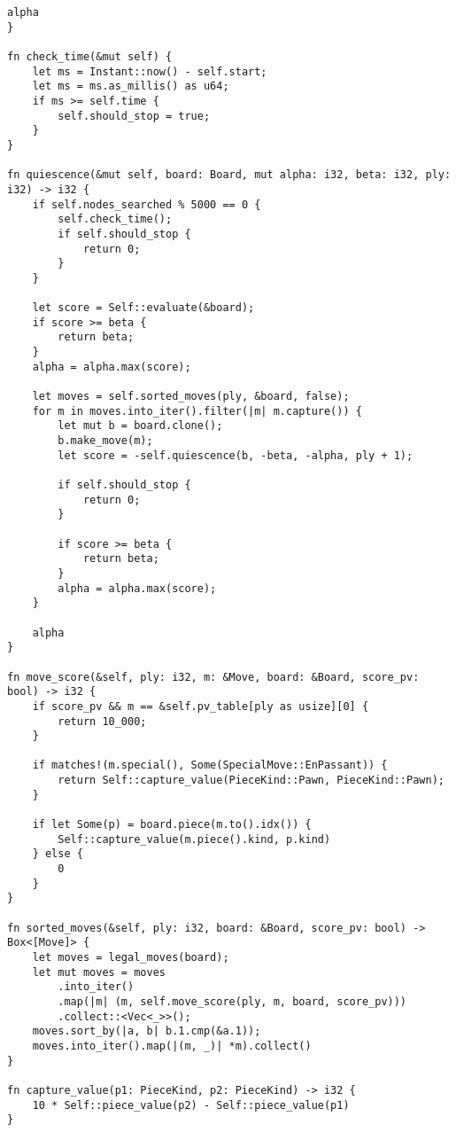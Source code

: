 \begin{lstlisting}[language=RustHtml]
    alpha
}

fn check_time(&mut self) {
    let ms = Instant::now() - self.start;
    let ms = ms.as_millis() as u64;
    if ms >= self.time {
        self.should_stop = true;
    }
}

fn quiescence(&mut self, board: Board, mut alpha: i32, beta: i32, ply: i32) -> i32 {
    if self.nodes_searched % 5000 == 0 {
        self.check_time();
        if self.should_stop {
            return 0;
        }
    }

    let score = Self::evaluate(&board);
    if score >= beta {
        return beta;
    }
    alpha = alpha.max(score);

    let moves = self.sorted_moves(ply, &board, false);
    for m in moves.into_iter().filter(|m| m.capture()) {
        let mut b = board.clone();
        b.make_move(m);
        let score = -self.quiescence(b, -beta, -alpha, ply + 1);

        if self.should_stop {
            return 0;
        }

        if score >= beta {
            return beta;
        }
        alpha = alpha.max(score);
    }

    alpha
}

fn move_score(&self, ply: i32, m: &Move, board: &Board, score_pv: bool) -> i32 {
    if score_pv && m == &self.pv_table[ply as usize][0] {
        return 10_000;
    }

    if matches!(m.special(), Some(SpecialMove::EnPassant)) {
        return Self::capture_value(PieceKind::Pawn, PieceKind::Pawn);
    }

    if let Some(p) = board.piece(m.to().idx()) {
        Self::capture_value(m.piece().kind, p.kind)
    } else {
        0
    }
}

fn sorted_moves(&self, ply: i32, board: &Board, score_pv: bool) -> Box<[Move]> {
    let moves = legal_moves(board);
    let mut moves = moves
        .into_iter()
        .map(|m| (m, self.move_score(ply, m, board, score_pv)))
        .collect::<Vec<_>>();
    moves.sort_by(|a, b| b.1.cmp(&a.1));
    moves.into_iter().map(|(m, _)| *m).collect()
}

fn capture_value(p1: PieceKind, p2: PieceKind) -> i32 {
    10 * Self::piece_value(p2) - Self::piece_value(p1)
}
\end{lstlisting}

